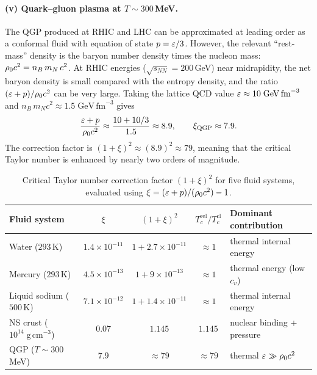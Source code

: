 \paragraph{(v) Quark--gluon plasma at $T \sim 300$\,MeV.}
The QGP produced at RHIC and LHC can be approximated at leading
order as a conformal fluid with equation of state
$p = \varepsilon/3$.  However, the relevant ``rest-mass'' density is
the baryon number density times the nucleon mass:
$\rho_0 c^{2} = n_{B}\,m_{N}\,c^{2}$.  At RHIC energies
($\sqrt{s_{NN}} = 200$\,GeV) near midrapidity, the net baryon
density is small compared with the entropy density, and the
ratio $(\varepsilon + p)/\rho_0 c^{2}$ can be very large.
Taking the lattice QCD value $\varepsilon \approx 10\;\mathrm{GeV\,fm}^{-3}$
and $n_{B}\,m_{N}c^{2} \approx 1.5\;\mathrm{GeV\,fm}^{-3}$ gives
\begin{equation}
\frac{\varepsilon + p}{\rho_0 c^{2}}
  \approx \frac{10 + 10/3}{1.5}
  \approx 8.9,
\qquad
\xi_{\mathrm{QGP}} \approx 7.9.
\end{equation}
The correction factor is
$(1+\xi)^{2} \approx (8.9)^{2} \approx 79$, meaning that the
critical Taylor number is enhanced by nearly two orders of magnitude.

\begin{table}[htbp]
\centering
\caption{Critical Taylor number correction factor $(1+\xi)^{2}$
for five fluid systems, evaluated using
$\xi = (\varepsilon + p)/(\rho_0 c^{2}) - 1$.}
\label{tab:rel-five-fluids}
\begin{tabular}{lcccl}
\hline
Fluid system & $\xi$ & $(1+\xi)^{2}$
  & $T_{c}^{\mathrm{rel}}/T_{c}^{\mathrm{cl}}$
  & Dominant contribution \\
\hline
Water ($293$\,K) &
  $1.4\times10^{-11}$ &
  $1 + 2.7\times10^{-11}$ &
  $\approx 1$ &
  thermal internal energy \\
Mercury ($293$\,K) &
  $4.5\times10^{-13}$ &
  $1 + 9\times10^{-13}$ &
  $\approx 1$ &
  thermal energy (low $c_{v}$) \\
Liquid sodium ($500$\,K) &
  $7.1\times10^{-12}$ &
  $1 + 1.4\times10^{-11}$ &
  $\approx 1$ &
  thermal internal energy \\
NS crust ($10^{14}\;\mathrm{g\,cm}^{-3}$) &
  $0.07$ &
  $1.145$ &
  $1.145$ &
  nuclear binding + pressure \\
QGP ($T\sim 300$\,MeV) &
  $7.9$ &
  $\approx 79$ &
  $\approx 79$ &
  thermal $\varepsilon \gg \rho_0 c^{2}$ \\
\hline
\end{tabular}
\end{table}

